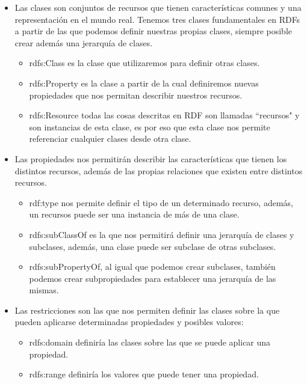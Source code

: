 \newpage
\begin{itemize}
	\item Las clases son conjuntos de recursos que tienen características comunes y una representación en el mundo real. Tenemos tres clases fundamentales en RDFs a partir de las que podemos definir nuestras propias clases, siempre posible crear además una jerarquía de clases.
	\begin{itemize}
		\item rdfs:Class es la clase que utilizaremos para definir otras clases.
		\item rdfs:Property es la clase a partir de la cual definiremos nuevas propiedades que nos permitan describir nuestros recursos.
		\item rdfs:Resource todas las cosas descritas en RDF son llamadas ``recursos" y son instancias de esta clase, es por eso que esta clase nos permite referenciar cualquier clases desde otra clase.
	\end{itemize}
	
	\item Las propiedades nos permitirán describir las características que tienen los distintos recursos, además de las propias relaciones que existen entre distintos recursos.
	\begin{itemize}
		\item rdf:type nos permite definir el tipo de un determinado recurso, además, un recursos puede ser una instancia de más de una clase.
		\item rdfs:subClassOf es la que nos permitirá definir una jerarquía de clases y subclases, además, una clase puede ser subclase de otras subclases.
		\item rdfs:subPropertyOf, al igual que podemos crear subclases, también podemos crear subpropiedades para establecer una jerarquía de las mismas.
	\end{itemize}
	
	\item Las restricciones son las que nos permiten definir las clases sobre la que pueden aplicarse determinadas propiedades y posibles valores:
	\begin{itemize}
		\item rdfs:domain definiría las clases sobre las que se puede aplicar una propiedad.
		\item rdfs:range definiría los valores que puede tener una propiedad.
	\end{itemize}
\end{itemize}

